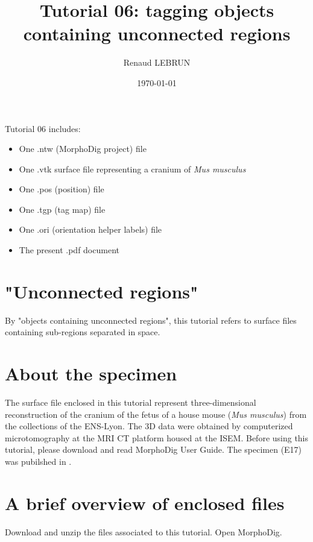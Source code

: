 \documentclass[12pt, a4paper]{book}
\title{Tutorial 06: tagging objects containing unconnected regions}
\author{Renaud LEBRUN}
\affil{Institut des Sciences de l'Evolution, Université de Montpellier, France}
\date{\today}
\begin{document}
	\dominitoc

\maketitle


\faketableofcontents



\minitoc 
Tutorial 06 includes:
\begin{itemize}
\item One .ntw (MorphoDig project) file
\item One .vtk surface file representing a cranium of \textit{Mus musculus}
\item One .pos (position) file 
\item One .tgp (tag map) file 
\item One .ori (orientation helper labels) file 
\item The present .pdf document
\end{itemize}




\section{"Unconnected regions"}
By "objects containing unconnected regions", this tutorial refers to surface files containing sub-regions separated in space.

\section{About the specimen}

The surface file enclosed in this tutorial represent three-dimensional reconstruction of the cranium of the fetus of a house mouse (\textit{Mus musculus}) from the collections of the ENS-Lyon. The 3D data were obtained by computerized microtomography at the MRI \si{\micro} CT platform housed at the ISEM.
Before using this tutorial, please download and read MorphoDig User Guide. The specimen (E17) was pubilshed in \citet{Hautier2014}.


\section{A brief overview of enclosed files}
		Download and unzip the files associated to this tutorial. Open MorphoDig.
\end{document}
